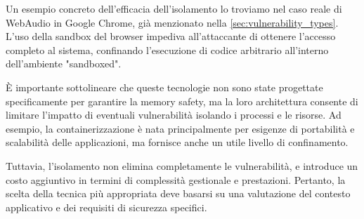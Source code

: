 Un esempio concreto dell'efficacia dell'isolamento lo troviamo nel caso reale di
WebAudio in Google Chrome, già menzionato nella \autoref{sec:vulnerability_types}.
L'uso della sandbox del browser impediva all'attaccante di ottenere l'accesso
completo al sistema, confinando l'esecuzione di codice arbitrario all'interno dell'ambiente
"sandboxed".\cite{webaudio_uaf}

È importante sottolineare che queste tecnologie non sono state progettate
specificamente per garantire la memory safety, ma la loro architettura consente di
limitare l'impatto di eventuali vulnerabilità isolando i processi e le risorse.
Ad esempio, la containerizzazione è nata principalmente per esigenze di portabilità
e scalabilità delle applicazioni, ma fornisce anche un utile livello di
confinamento.

Tuttavia, l'isolamento non elimina completamente le vulnerabilità, e introduce
un costo aggiuntivo in termini di complessità gestionale e prestazioni. Pertanto,
la scelta della tecnica più appropriata deve basarsi su una valutazione del
contesto applicativo e dei requisiti di sicurezza specifici.